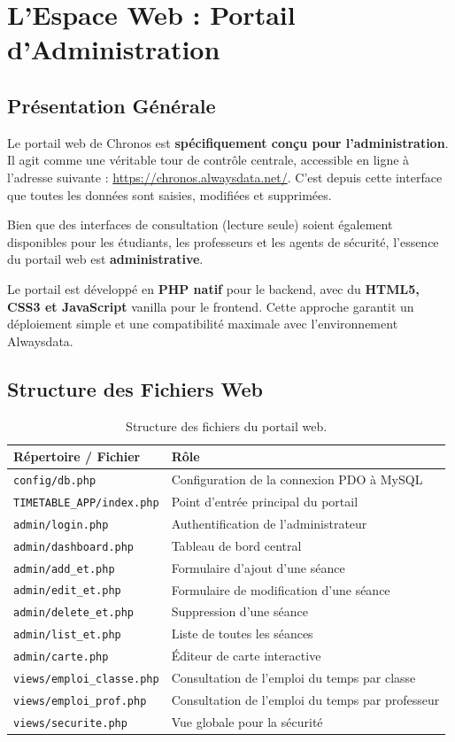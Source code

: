 \documentclass[12pt, a4paper]{report}
\begin{document}
\chapter{L'Espace Web : Portail d'Administration}

\section{Présentation Générale}

Le portail web de Chronos est \textbf{spécifiquement conçu pour l'administration}. Il agit comme une véritable tour de contrôle centrale, accessible en ligne à l'adresse suivante : \url{https://chronos.alwaysdata.net/}. C'est depuis cette interface que toutes les données sont saisies, modifiées et supprimées.

Bien que des interfaces de consultation (lecture seule) soient également disponibles pour les étudiants, les professeurs et les agents de sécurité, l'essence du portail web est \textbf{administrative}.

Le portail est développé en \textbf{PHP natif} pour le backend, avec du \textbf{HTML5, CSS3 et JavaScript} vanilla pour le frontend. Cette approche garantit un déploiement simple et une compatibilité maximale avec l'environnement Alwaysdata.

\section{Structure des Fichiers Web}

\begin{table}[H]
\centering
\renewcommand{\arraystretch}{1.3}
\begin{tabularx}{\textwidth}{l X}
\toprule
\textbf{Répertoire / Fichier} & \textbf{Rôle} \\
\midrule
\texttt{config/db.php} & Configuration de la connexion PDO à MySQL \\
\texttt{TIMETABLE\_APP/index.php} & Point d'entrée principal du portail \\
\texttt{admin/login.php} & Authentification de l'administrateur \\
\texttt{admin/dashboard.php} & Tableau de bord central \\
\texttt{admin/add\_et.php} & Formulaire d'ajout d'une séance \\
\texttt{admin/edit\_et.php} & Formulaire de modification d'une séance \\
\texttt{admin/delete\_et.php} & Suppression d'une séance \\
\texttt{admin/list\_et.php} & Liste de toutes les séances \\
\texttt{admin/carte.php} & Éditeur de carte interactive \\
\texttt{views/emploi\_classe.php} & Consultation de l'emploi du temps par classe \\
\texttt{views/emploi\_prof.php} & Consultation de l'emploi du temps par professeur \\
\texttt{views/securite.php} & Vue globale pour la sécurité \\
\bottomrule
\end{tabularx}
\caption{Structure des fichiers du portail web.}
\end{table}
\end{document}
